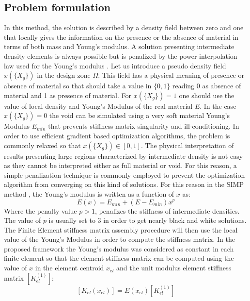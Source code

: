 \subsection{Problem formulation}
In this method, the solution is described by a density field between zero and one that locally gives the information on the presence or the absence of material in terms of both mass and Young's modulus. 
A solution presenting intermediate density elements is always possible but is penalized by the power interpolation law used for the Young's modulus \cite{bendsoe1989optimal}.  Let us introduce a pseudo density field $x(\lbrace X_g \rbrace)$ in the design zone $\Omega$. This field has a physical meaning of presence or absence of material so that should take a value in $\{0,1\}$ reading 0 as absence of material and 1 as presence of material. For $x(\lbrace X_g \rbrace)=1$ one should use the value of local density and Young's Modulus of the real material $E$. In the case $x(\lbrace X_g \rbrace)=0$ the void can be simulated using a very soft material Young's Modulus $E_{min}$ that prevents stiffness matrix singularity and ill-conditioning. 
In order to use efficient gradient based optimization algorithms, the problem is commonly relaxed so that $x(\lbrace X_g \rbrace)\in [0,1]$. The physical interpretation of results presenting large regions characterized by intermediate density is not easy as they cannot be interpreted either as full material or void. For this reason, a simple penalization technique is commonly employed to prevent the optimization algorithm from converging on this kind of solutions. For this reason in the SIMP method \cite{bendsoe1989optimal}, the Young's modulus is written as a function of $x$ as:
\begin{equation}
\label{eq.6}
E(x)=E_{min}+(E-E_{min})x^p
\end{equation}
Where the penalty value $p>1$, penalizes the stiffness of intermediate densities.
The value of $p$ is usually set to 3 in order to get nearly black and white solutions. 
The Finite Element stiffness matrix assembly procedure will then use the local value of the Young's Modulus in order to compute the stiffness matrix. In the proposed framework the Young's modulus was considered as constant in each finite element so that the element stiffness matrix can be computed using the value of $x$ in the element centroid $x_{el}$ and the unit modulus element stiffness matrix $\left[K_{el}^{(1)}\right]$:
\begin{equation}
\label{eq.7}
\left[K_{el}(x_{el})\right]=E(x_{el})\left[K_{el}^{(1)}\right]
\end{equation}
